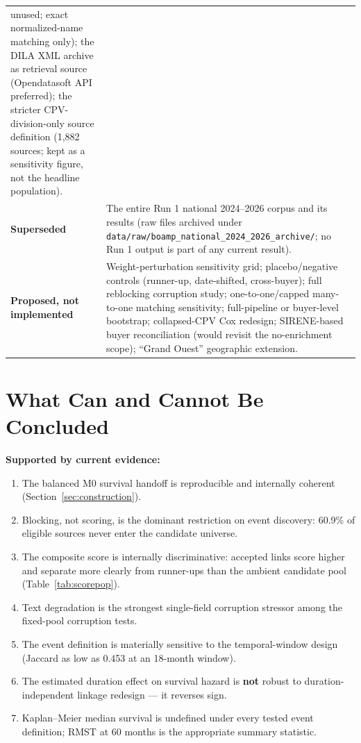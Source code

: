 \documentclass[11pt]{article}
\begin{document}
\begin{table}[h!]
\begin{tabular}{p{}p{}}
unused; exact normalized-name matching only); the DILA XML archive as
retrieval source (Opendatasoft API preferred); the stricter
CPV-division-only source definition (1{,}882 sources; kept as a sensitivity
figure, not the headline population). \\
\addlinespace
\textbf{Superseded} &
The entire Run 1 national 2024--2026 corpus and its results (raw files
archived under \texttt{data/raw/boamp\_national\_2024\_2026\_archive/};
no Run 1 output is part of any current result). \\
\addlinespace
\textbf{Proposed, not implemented} &
Weight-perturbation sensitivity grid; placebo/negative controls
(runner-up, date-shifted, cross-buyer); full reblocking corruption study;
one-to-one/capped many-to-one matching sensitivity; full-pipeline or
buyer-level bootstrap; collapsed-CPV Cox redesign; SIRENE-based buyer
reconciliation (would revisit the no-enrichment scope); ``Grand Ouest''
geographic extension. \\
\bottomrule
\end{tabular}
\end{table}

\section{What Can and Cannot Be Concluded}
\label{sec:conclusions}

\textbf{Supported by current evidence:}
\begin{enumerate}
  \item The balanced M0 survival handoff is reproducible and internally
  coherent (Section~\ref{sec:construction}).
  \item Blocking, not scoring, is the dominant restriction on event
  discovery: 60.9\% of eligible sources never enter the candidate universe.
  \item The composite score is internally discriminative: accepted links
  score higher and separate more clearly from runner-ups than the ambient
  candidate pool (Table~\ref{tab:scorepop}).
  \item Text degradation is the strongest single-field corruption stressor
  among the fixed-pool corruption tests.
  \item The event definition is materially sensitive to the temporal-window
  design (Jaccard as low as 0.453 at an 18-month window).
  \item The estimated duration effect on survival hazard is \textbf{not}
  robust to duration-independent linkage redesign --- it reverses sign.
  \item Kaplan--Meier median survival is undefined under every tested event
  definition; RMST at 60 months is the appropriate summary statistic.
\end{enumerate}
\end{document}
